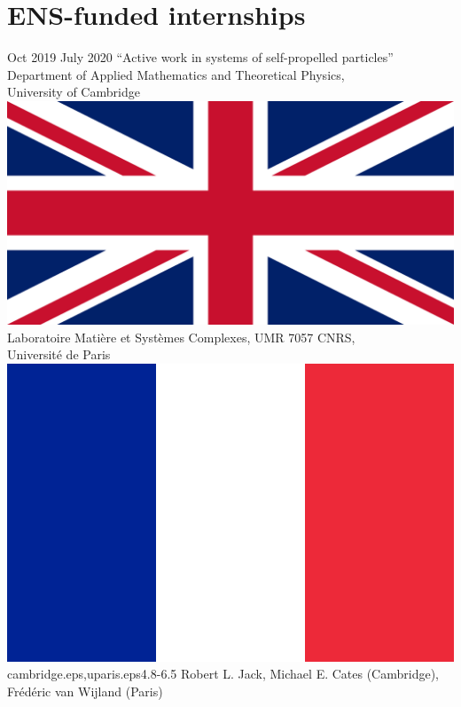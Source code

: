\documentclass[a4paper]{cvtemplate_en} %
\begin{document}
\begin{cvbody}
\end{cvbody}

\section{ENS-funded internships}

\begin{cvbody}

\cvitem
	{Oct 2019}
	{July 2020}
  {``Active work in systems of self-propelled particles''}
  {Department of Applied Mathematics and Theoretical Physics,\\ University of Cambridge \includegraphics[height=0.8\myheight]{uk}\\
	Laboratoire Mati\`ere et Syst\`emes Complexes, UMR 7057 CNRS,\\ Universit\'e de Paris \includegraphics[height=0.8\myheight]{fr}}
  {cambridge.eps,uparis.eps}{4.8}{-6.5}
	{Robert L. Jack, Michael E. Cates (Cambridge),\\ Fr\'ed\'eric van Wijland (Paris)}
  {\\}


\end{cvbody}
\end{document}
